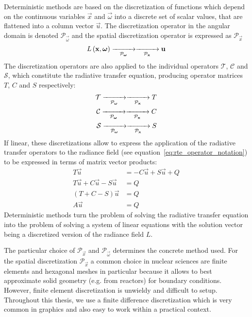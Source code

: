 Deterministic methods are based on the discretization of functions which depend on the continuous variables $\vec{x}$ and $\vec{\omega}$ into a discrete set of scalar values, that are flattened into a column vector $\vec{u}$. The discretization operator in the angular domain is denoted $\mathcal{P}_{\vec{\omega}}$ and the spatial discretization operator is expressed as $\mathcal{P}_{\vec{x}}$
\begin{align*}
L\left(\vec{x}, \vec{\omega}\right)
\xrightarrow[\mathcal{P}_{\vec{\omega}}]{\makebox[1cm]{}}
\xrightarrow[\mathcal{P}_{\vec{x}}]{\makebox[1cm]{}}
\vec{u}
\end{align*}
The discretization operators are also applied to the individual operators $\mathcal{T}$, $\mathcal{C}$ and $\mathcal{S}$, which constitute the radiative transfer equation, producing operator matrices $T$, $C$ and $S$ respectively:
\begin{align*}
\mathcal{T}
\xrightarrow[\mathcal{P}_{\vec{\omega}}]{\makebox[1cm]{}}
\xrightarrow[\mathcal{P}_{\vec{x}}]{\makebox[1cm]{}}
T
\\
\mathcal{C}
\xrightarrow[\mathcal{P}_{\vec{\omega}}]{\makebox[1cm]{}}
\xrightarrow[\mathcal{P}_{\vec{x}}]{\makebox[1cm]{}}
C
\\
\mathcal{S}
\xrightarrow[\mathcal{P}_{\vec{\omega}}]{\makebox[1cm]{}}
\xrightarrow[\mathcal{P}_{\vec{x}}]{\makebox[1cm]{}}
S
\end{align*}
If linear, these discretizations allow to express the application of the radiative transfer operators to the radiance field (see equation~\ref{eq:rte_operator_notation}) to be expressed in terms of matrix vector products:
\begin{align*}
T\vec{u}&=-C\vec{u}+S\vec{u}+Q
\\
T\vec{u}+C\vec{u}-S\vec{u}&=Q
\\
(T+C-S)\vec{u}&=Q
\\
A\vec{u}&=Q
\end{align*}
Deterministic methods turn the problem of solving the radiative transfer equation into the problem of solving a system of linear equations with the solution vector being a discretized version of the radiance field $L$.

The particular choice of $\mathcal{P}_{\vec{x}}$ and $\mathcal{P}_{\vec{\omega}}$ determines the concrete method used. For the spatial discretization $\mathcal{P}_{\vec{x}}$ a common choice in nuclear sciences are finite elements and hexagonal meshes in particular because it allows to best approximate solid geometry (e.g. from reactors) for boundary conditions. However, finite element discretization is unwieldy and difficult to setup. Throughout this thesis, we use a finite difference discretization which is very common in graphics and also easy to work within a practical context.

